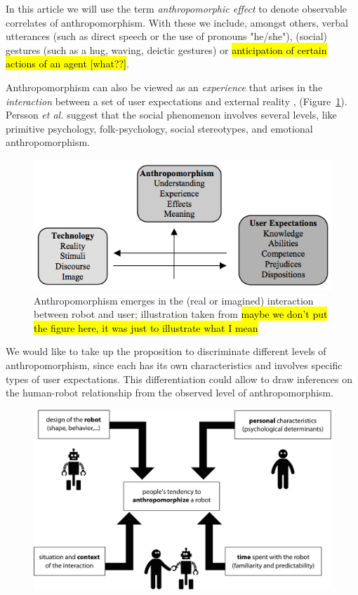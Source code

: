 \documentclass{frontiersSCNS} %
\begin{document}
In this article we will use the term \emph{anthropomorphic effect} to denote
observable correlates of anthropomorphism. With these we include, amongst
others, verbal utterances (such as direct speech or the use of pronouns
"he/she"), (social) gestures (such as a hug, waving, deictic gestures) or
\hl{anticipation of certain actions of an agent [what??]}.

Anthropomorphism can also be viewed as an \textit{experience} that arises in the
\textit{interaction} between a set of user expectations and external reality
\cite{persson_anthropomorphism_2000},
(Figure~\ref{fig:anthropomorphism_and_interaction}). Persson \textit{et al.}
suggest that the social phenomenon involves several levels, like primitive
psychology, folk-psychology, social stereotypes, and emotional anthropomorphism. 

\begin{figure}[ht!]\centering
  \includegraphics[scale=0.42]{persson_anthropomorphism.png}
 \caption{Anthropomorphism emerges in the (real or imagined) interaction between
 robot and user; illustration taken from \cite{persson_anthropomorphism_2000}
 \hl{maybe we don't put the figure here, it was just to illustrate what I mean}}

 \label{fig:anthropomorphism_and_interaction}       %
 \end{figure}

We would like to take up the proposition to discriminate different levels of
anthropomorphism, since each has its own characteristics and involves specific
types of user expectations. This differentiation could allow to draw inferences
on the human-robot relationship from the observed level of anthropomorphism.

\begin{figure}
    \centering
    \includegraphics[width=0.6\columnwidth]{factors}
    \caption{}
    \label{factors}
\end{figure}
\end{document}
